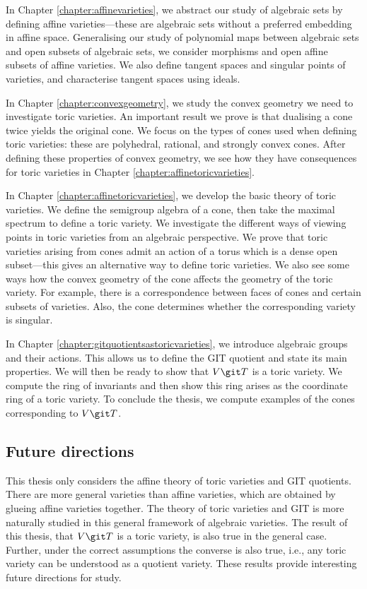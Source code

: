 \documentclass[12pt]{amsart}
\theoremstyle{plain}
\begin{document}
In Chapter \ref{chapter:affinevarieties}, we abstract our study of algebraic sets by defining affine varieties---these are algebraic sets without a preferred embedding in affine space.
Generalising our study of polynomial maps between algebraic sets and open subsets of algebraic sets, we consider morphisms and open affine subsets of affine varieties.
We also define tangent spaces and singular points of varieties, and characterise tangent spaces using ideals.

In Chapter \ref{chapter:convexgeometry}, we study the convex geometry we need to investigate toric varieties.
An important result we prove is that dualising a cone twice yields the original cone.
We focus on the types of cones used when defining toric varieties: these are polyhedral, rational, and strongly convex cones.
After defining these properties of convex geometry, we see how they have consequences for toric varieties in Chapter \ref{chapter:affinetoricvarieties}.

In Chapter \ref{chapter:affinetoricvarieties}, we develop the basic theory of toric varieties.
We define the semigroup algebra of a cone, then take the maximal spectrum to define a toric variety.
We investigate the different ways of viewing points in toric varieties from an algebraic perspective.
We prove that toric varieties arising from cones admit an action of a torus which is a dense open subset---this gives an alternative way to define toric varieties.
We also see some ways how the convex geometry of the cone affects the geometry of the toric variety.
For example, there is a correspondence between faces of cones and certain subsets of varieties. 
Also, the cone determines whether the corresponding variety is singular.

In Chapter \ref{chapter:gitquotientsastoricvarieties}, we introduce algebraic groups and their actions.
This allows us to define the GIT quotient and state its main properties.
We will then be ready to show that $V \git T$ is a toric variety.
We compute the ring of invariants and then show this ring arises as the coordinate ring of a toric variety.
To conclude the thesis, we compute examples of the cones corresponding to $V \git T$.

\subsection*{Future directions}
This thesis only considers the affine theory of toric varieties and GIT quotients.
There are more general varieties than affine varieties, which are obtained by glueing affine varieties together.
The theory of toric varieties and GIT is more naturally studied in this general framework of algebraic varieties.
The result of this thesis, that $V \git T$ is a toric variety, is also true in the general case.
Further, under the correct assumptions the converse is also true, i.e., any toric variety can be understood as a quotient variety.
These results provide interesting future directions for study.
\end{document}

